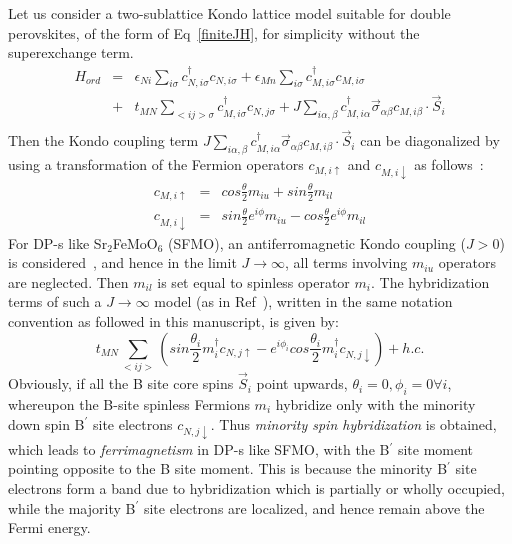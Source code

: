 \documentclass[english,aps,prb,twocolumn,showpacs]{revtex4-1}
\begin{document}
Let us consider a two-sublattice Kondo lattice model suitable for double perovskites,
 of the form of Eq~\ref{finiteJH}, for simplicity without the superexchange term.
\begin{eqnarray}
H_{ord}&=&\epsilon_{Ni}\sum_{i\sigma}c_{N,i\sigma}^{\dagger}c_{N,i\sigma}+\epsilon_{Mn}\sum_{i\sigma}c_{M,i\sigma}^{\dagger}c_{M,i\sigma} \nonumber \\
 &+&t_{MN}\sum_{<ij>\sigma}c_{M,i\sigma}^{\dagger}c_{N,j\sigma}
+J\sum_{i\alpha,\beta}c_{M,i\alpha}^{\dagger}\vec{\sigma}_{\alpha\beta}c_{M,i\beta}\cdot \vec{S}_{i} \nonumber \\
\end{eqnarray}
 Then the Kondo coupling term $J\sum_{i\alpha,\beta}c_{M,i\alpha}^{\dagger}\vec{\sigma}_{\alpha\beta} c_{M,i\beta}\cdot \vec{S}_{i} $ can be diagonalized by using a 
transformation of the Fermion operators $c_{M,i\uparrow}$ and $c_{M,i\downarrow}$ as follows~\cite{FGuinea}:
\begin{eqnarray}
c_{M,i\uparrow}&=&cos\frac{\theta}{2}m_{iu}+sin\frac{\theta}{2}m_{il} \nonumber\\
c_{M,i\downarrow}&=&sin\frac{\theta}{2}e^{i\phi}m_{iu}-cos\frac{\theta}{2}e^{i\phi}m_{il} 
\end{eqnarray}
For DP-s like Sr$_{2}$FeMoO$_{6}$ (SFMO), an antiferromagnetic Kondo coupling ($J>0$) 
is considered~\cite{Millis,FGuinea},
 and hence in the limit $J\rightarrow\infty$, all terms involving $m_{iu}$ operators are neglected. Then $m_{il}$ is
 set equal to spinless operator $m_{i}$. 
The hybridization terms of such a $J\rightarrow\infty$ model (as in Ref~\cite{FGuinea}), 
written in the same notation convention as followed in 
 this manuscript, is given by:
\begin{equation}
t_{MN}\sum_{<ij>} (sin\frac{\theta_{i}}{2}m^{\dagger}_{i}c_{N,j\uparrow}-e^{i\phi_{i}}cos\frac{\theta_{i}}{2}m^{\dagger}_{i}c_{N,j\downarrow}) +h.c.
\end{equation}
Obviously, if all the B site core spins $\vec{S}_{i}$ point upwards, $\theta_{i}=0,\phi_{i}=0 \forall i$, 
 whereupon the B-site spinless Fermions $m_{i}$ hybridize only with the minority down spin B$^{\prime}$ site
 electrons $c_{N,j\downarrow}$. Thus {\em minority spin hybridization} is obtained, which leads to {\em ferrimagnetism} in DP-s like SFMO, with the B$^{\prime}$
 site moment pointing opposite to the B site moment. This is because the minority B$^{\prime}$ site electrons form
 a band due to hybridization which is partially or wholly occupied, while the majority B$^{\prime}$ site electrons are
 localized, and hence remain above the Fermi energy.
\end{document}

